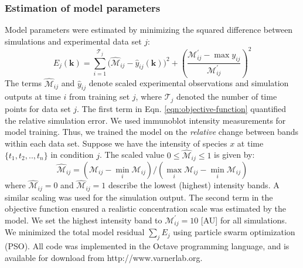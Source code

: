\documentclass[10pt,twocolumn,twoside,final]{IEEEtran}
\begin{document}
\noindent\subsubsection*{Estimation of model parameters}
Model parameters were estimated by minimizing the squared difference between simulations and experimental data set $j$:
\begin{equation}\label{eqn:objective-function}
	E_{j}(\mathbf{k}) = \sum_{i=1}^{\mathcal{T}_{j}}\biggl(\hat{\mathcal{M}}_{ij}-\hat{y}_{ij}(\mathbf{k})\biggr)^2 + \left(\frac{{\mathcal{M}^{\prime}_{ij}}-\max{y_{ij}}}{{\mathcal{M}^{\prime}_{ij}}}\right)^{2}
\end{equation}
The terms $\hat{\mathcal{M}}_{ij}$ and $\hat{y}_{ij}$ denote scaled experimental observations and simulation outputs at time $i$ from training set $j$,
where $\mathcal{T}_{j}$ denoted the number of time points for data set $j$.
The first term in Eqn. \eqref{eqn:objective-function} quantified the relative simulation error.
We used immunoblot intensity measurements for model training.
Thus, we trained the model on the \emph{relative} change between bands within each data set.
Suppose we have the intensity of species $x$ at time $\{t_{1},t_{2},..,t_{n}\}$ in condition $j$.
The scaled value $0\leq\hat{\mathcal{M}}_{ij}\leq{1}$ is given by:
\begin{equation}\label{norm_exp_data}
\hat{\mathcal{M}}_{ij} = \left({\mathcal{M}_{ij} - \min_{i}\mathcal{M}_{ij}}\right)/\left({\max_{i}{\mathcal{M}_{ij}}-\min_{i}{\mathcal{M}_{ij}}}\right)
\end{equation}
where $\hat{\mathcal{M}}_{ij}=0$ and $\hat{\mathcal{M}}_{ij}=1$  describe the lowest (highest) intensity bands.
A similar scaling was used for the simulation output. The second term in the objective function ensured a realistic concentration scale was estimated by the model.
We set the highest intensity band to $\mathcal{M}^{\prime}_{ij} = 10$ [AU] for all simulations.
We minimized the total model residual $\sum_{j}E_{j}$ using particle swarm optimization (PSO).
All code was implemented in the Octave programming language, and is available for
download from http://www.varnerlab.org.

\end{document}
